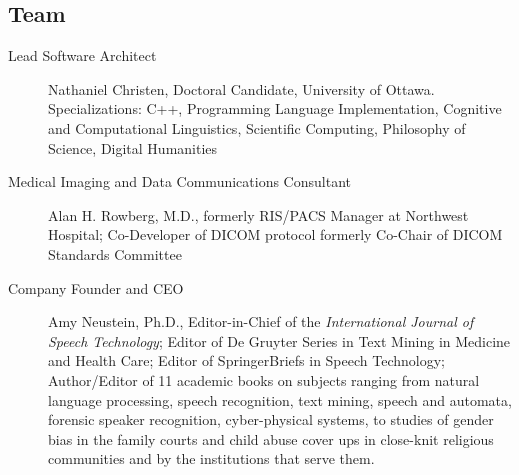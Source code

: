 
\begin{frame}{}
\section{Team}


\begin{center}
\begin{minipage}{0.8\textwidth}
{\LARGE \setlength{\leftmargini}{3pt}\begin{description}
\item[Lead Software Architect] Nathaniel Christen, Doctoral Candidate, University of Ottawa.  
Specializations: C++, Programming Language 
Implementation, Cognitive and Computational 
Linguistics, Scientific Computing, Philosophy 
of Science, Digital Humanities 
\item[Medical Imaging and Data Communications Consultant] Alan H. Rowberg, M.D., formerly
RIS/PACS Manager at Northwest Hospital; Co-Developer of DICOM protocol formerly Co-Chair
of DICOM Standards Committee
\item[Company Founder and CEO] Amy Neustein, Ph.D., Editor-in-Chief of the \textit{International Journal of
Speech Technology}; Editor of De Gruyter Series in Text Mining in Medicine and Health Care;
Editor of SpringerBriefs in Speech Technology; Author/Editor of 11 academic books on subjects
ranging from natural language processing, speech recognition, text mining, speech and
automata, forensic speaker recognition, cyber-physical systems, to studies of gender bias in the
family courts and child abuse cover ups in close-knit religious communities and by the institutions
that serve them.  
\end{description}}
\end{minipage}
\end{center}


\end{frame}
